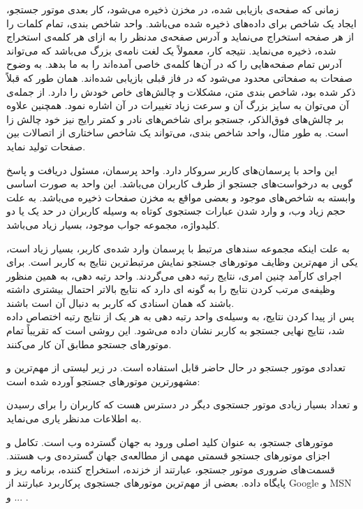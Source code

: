 زمانی که صفحه‌ی بازیابی شده، در مخزن ذخیره می‌شود، کار بعدی موتور جستجو، ایجاد یک شاخص برای داده‌های ذخیره شده می‌باشد. واحد شاخص بندی، تمام کلمات را از هر صفحه استخراج می‌نماید و آدرس صفحه‌ی مدنظر را به ازای هر کلمه‌ی استخراج شده، ذخیره می‌نماید. نتیجه کار، معمولاً یک لغت نامه‌ی بزرگ می‌باشد که می‌تواند آدرس تمام صفحه‌هایی را که در آن‌ها کلمه‌ی خاصی آمده‌اند را به ما بدهد. به وضوح صفحات به صفحاتی محدود می‌شود که در فاز قبلی بازیابی شده‌اند. همان طور که قبلاً ذکر شده بود، شاخص بندی متن، مشکلات و چالش‌های خاص خودش را دارد. از جمله‌ی آن می‌توان به سایز بزرگ آن و سرعت زیاد تغییرات در آن اشاره نمود. همچنین علاوه بر چالش‌های فوق‌الذکر، جستجو برای شاخص‌های نادر و کمتر رایج نیز خود چالش زا است. به طور مثال، واحد شاخص بندی، می‌تواند یک شاخص ساختاری از اتصالات بین صفحات تولید نماید.

این واحد با پرسمان‌های کاربر سروکار دارد. واحد پرسمان، مسئول دریافت و پاسخ گویی به درخواست‌های جستجو از طرف کاربران می‌باشد. این واحد به صورت اساسی وابسته به شاخص‌های موجود و بعضی مواقع به مخزن صفحات ذخیره می‌باشد. به علت حجم زیاد وب، و وارد شدن عبارات جستجوی کوتاه به وسیله کاربران در حد یک یا دو کلیدواژه، مجموعه جواب موجود، بسیار زیاد می‌باشد.

به علت اینکه مجموعه سندهای مرتبط با پرسمان وارد شده‌ی کاربر، بسیار زیاد است، یکی از مهم‌ترین وظایف موتورهای جستجو نمایش مرتبط‌ترین نتایج به کاربر است. برای اجرای کارآمد چنین امری، نتایج رتبه دهی می‌گردند. واحد رتبه دهی، به همین منظور وظیفه‌ی مرتب کردن نتایج را به گونه ای دارد که نتایج بالاتر احتمال بیشتری داشته باشند که همان اسنادی که کاربر به دنبال آن است باشند.
\\
پس از پیدا کردن نتایج، به وسیله‌ی واحد رتبه دهی به هر یک از نتایج رتبه اختصاص داده شد، نتایج نهایی جستجو به کاربر نشان داده می‌شود. این روشی است که تقریباً تمام موتورهای جستجو مطابق آن کار می‌کنند.

تعدادی موتور جستجو در حال حاضر قابل استفاده است. در زیر لیستی از مهم‌ترین و مشهور‌ترین موتورهای جستجو آورده شده است:



و تعداد بسیار زیادی موتور جستجوی دیگر در دسترس هست که کاربران را برای رسیدن به اطلاعات مدنظر یاری می‌نماید.

موتورهای جستجو، به عنوان کلید اصلی ورود به جهان گسترده وب است. تکامل و اجزای موتورهای جستجو قسمتی مهمی از مطالعه‌ی جهان گسترده‌ی وب هستند. قسمت‌های ضروری موتور جستجو، عبارتند از خزنده، استخراج کننده، برنامه ریز و پایگاه داده. بعضی از مهم‌ترین موتورهای جستجوی پرکاربرد عبارتند از Google و MSN و ... .
\\